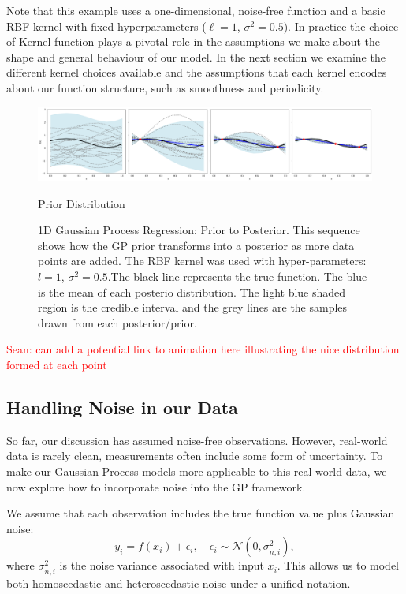 \documentclass{article}
\newcommand{\Sean}[1]{{\textcolor{red}{{Sean: #1}} }}
\begin{document}
\noindent
Note that this example uses a one-dimensional, noise-free function and a basic RBF kernel with fixed hyperparameters (\(\ell = 1\), \(\sigma^2 = 0.5\)). 
In practice the choice of Kernel function plays a pivotal role in the assumptions we make about the shape and general behaviour of our model. In the next section
we examine the different kernel choices available and the assumptions that each kernel encodes about our function structure, such as smoothness and periodicity.



\begin{figure}[H]
    \centering
        \includegraphics[width=\textwidth]{LatexPlots/1dplots/priortoposterior.png}
        \caption{Prior Distribution}
    \caption{1D Gaussian Process Regression: Prior to Posterior. This sequence shows how the GP prior transforms into a posterior as more data points are added. 
    The RBF kernel was used with hyper-parameters: $l = 1$, $\sigma^2 = 0.5$.The black line represents the true function. The blue is the mean of each posterio distribution. 
    The light blue shaded region is the credible interval and the grey lines are the samples drawn from each posterior/prior. }
    \label{fig: priortoposterior}
\end{figure}
\Sean{can add a potential link to animation here illustrating the nice distribution formed at each point}




\subsection{Handling Noise in our Data}
\label{sec: Handlingnoise}

So far, our discussion has assumed noise-free observations. However, real-world data is rarely clean, measurements often include some form of uncertainty. To make our Gaussian Process models more applicable to this real-world data,
we now explore how to incorporate noise into the GP framework.

\bigskip

\noindent
We assume that each observation includes the true function value plus Gaussian noise:
\begin{equation}
y_i = f(x_i) + \epsilon_i, \quad \epsilon_i \sim \mathcal{N}(0, \sigma_{n,i}^2),
\end{equation}
where \( \sigma_{n,i}^2 \) is the noise variance associated with input \( x_i \). This allows us to model both homoscedastic and heteroscedastic noise under a unified notation.
\end{document}
